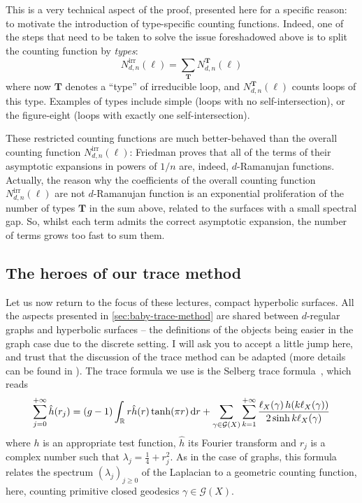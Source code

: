 \documentclass[12pt,twoside]{article}
\theoremstyle{theorem}
\theoremstyle{remark}
\theoremstyle{definition}
\theoremstyle{example}
\newcommand{\R}{\mathbb{R}}
\renewcommand{\d}{\, \mathrm{d}}
\newcommand{\1}[1]{\mathds{1}_{#1}}
\let\div\relax
\newcommand{\div}[1]{\left(\frac{#1}{2}\right)}
\newcommand{\cG}{\mathcal{G}}
\newcommand{\type}{\mathbf{T}}
\begin{document}
This is a very technical aspect of the proof, %
 presented here for a specific reason: to motivate the introduction of type-specific counting
functions. Indeed, one of the steps that need to be taken to solve the issue foreshadowed above is
to split the counting function by \emph{types}:
\begin{equation}
  N_{d,n}^{\mathrm{irr}}(\ell) = \sum_{\type} N_{d,n}^\type(\ell)  
\end{equation}
where now $\type$ denotes a ``type'' of irreducible loop, and $N_{d,n}^\type(\ell)$ counts loops of
this type. Examples of types include simple (loops with no self-intersection), or the figure-eight
(loops with exactly one self-intersection).

These restricted counting functions are much better-behaved than the overall counting function
$N_{d,n}^{\mathrm{irr}}(\ell)$: Friedman proves that all of the terms of their asymptotic expansions
in powers of $1/n$ are, indeed, $d$-Ramanujan functions. Actually, the reason why the coefficients
of the overall counting function $N_{d,n}^{\mathrm{irr}}(\ell)$ are not $d$-Ramanujan function is an
exponential proliferation of the number of types $\type$ in the sum above, related to the surfaces
with a small spectral gap. So, whilst each term admits the correct asymptotic expansion, the
number of terms grows too fast to sum them.

\subsection{The heroes of our trace method}
\label{sec:heroes-our-trace}

Let us now return to the focus of these lectures, compact hyperbolic surfaces. All the aspects
presented in \cref{sec:baby-trace-method} are shared between $d$-regular graphs and hyperbolic
surfaces -- the definitions of the objects being easier in the graph case due to the discrete
setting. I will ask you to accept a little jump here, and trust that the discussion of the trace
method can be adapted (more details can be found in \cite{anantharaman2023,anantharaman2024}). The
trace formula we use is the Selberg trace formula~\cite{selberg1956}, which reads
\begin{equation}
  \label{eq:tr_selb}
  \sum_{j=0}^{+ \infty} \hat{h}(r_j)
  = (g-1) \int_\R r \hat{h}(r)  \tanh(\pi r) \d r
  + \sum_{\gamma \in \cG(X)}
  \sum_{k=1}^{+ \infty}
  \frac{\ell_X(\gamma) \, h(k \ell_X(\gamma))}{2 \sinh \div{k \ell_X(\gamma)}}
\end{equation}
where $h$ is an appropriate test function, $\hat{h}$ its Fourier transform and $r_j$ is a complex
number such that $\lambda_j = \frac 14 + r_j^2$.  As in the case of graphs, this formula relates the
spectrum $(\lambda_j)_{j \geq 0}$ of the Laplacian to a geometric counting function, here, counting
primitive closed geodesics $\gamma \in \cG(X)$.
\end{document}
